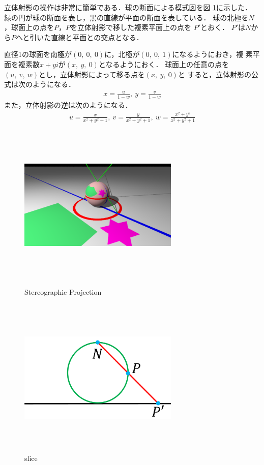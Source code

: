 立体射影の操作は非常に簡単である．球の断面による模式図を図
\ref{fig:stereoProjectSlice}に示した．
緑の円が球の断面を表し，黒の直線が平面の断面を表している．
球の北極を$N$，球面上の点を$P$，$P$を立体射影で移した複素平面上の点を
$P'$とおく．
$P'$は$N$から$P$へと引いた直線と平面との交点となる．

直径1の球面を南極が$(0,~0,~0)$に，北極が$(0,~0,~1)$になるようにおき，複
素平面を複素数$x + yi$が$(x,~y,~0)$となるようにおく．
球面上の任意の点を$(u,~v,~w)$とし，立体射影によって移る点を$(x,~y,~0)$と
すると，立体射影の公式は次のようになる．
\begin{align*}
 x = \frac{u}{1 - w},~y = \frac{v}{1 - w}
\end{align*}
また，立体射影の逆は次のようになる．
\begin{align*}
 u = \frac{x}{x^2 + y^2 + 1},~v = \frac{y}{x^2 + y^2 + 1},~
 w = \frac{x^2 + y^2}{x^2 + y^2 + 1}
\end{align*}

\begin{figure}[htbp]
 \begin{minipage}{0.5\hsize}
  \center
  \includegraphics[width=3in, height=3in, keepaspectratio]{../img/klein/stereoProject.pdf}
  \caption{Stereographic Projection}
  \label{fig:stereoProject}  
 \end{minipage}
 \begin{minipage}{0.5\hsize}
  \center
  \includegraphics[width=3in, height=3in, keepaspectratio]{../img/klein/stereoProjectSlice.pdf}
  \caption{slice}
  \label{fig:stereoProjectSlice}
 \end{minipage}
\end{figure}

